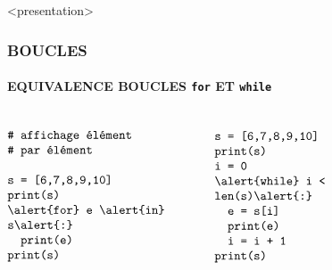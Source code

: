 \begin{frame}<presentation>
\frametitle{\uppercase{Boucles}}
\framesubtitle{\uppercase{Equivalence boucles {\tt for} et {\tt while}}}
\begin{columns}[T]
\column{5.25cm}

$$\begin{minipage}{5.25cm}\tt
\# affichage élément \\
\# par élément\\
\mbox{}\\
s = [6,7,8,9,10]\\
{print(s)}\\
\alert{for} e \alert{in} s\alert{:}\\
\mbox{}\ \ print(e)\\
{print(s)}
\end{minipage}$$

\column{5.25cm}

$$\begin{minipage}{5.25cm}\tt
s = [6,7,8,9,10]\\
{print(s)}\\
i = 0\\
\alert{while} i < len(s)\alert{:}\\
\mbox{}\ \ e = s[i]\\
\mbox{}\ \ print(e)\\
\mbox{}\ \ i = i + 1\\
{print(s)}
\end{minipage}$$

\end{columns}

\end{frame}
\note{}

